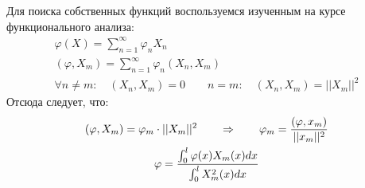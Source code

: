 \documentclass[../main.tex]{subfiles}
\begin{document}
    Для поиска собственных функций воспользуемся изученным на курсе функционального анализа:
    \begin{gather*}
        \varphi(X) = \sum_{n=1}^{\infty} \varphi_n X_n\\
        (\varphi, X_m) = \sum_{n=1}^{\infty} \varphi_n (X_n,X_m)\\
        \forall n \neq m:\quad (X_n,X_m) = 0 \qquad n=m: \quad (X_n,X_m)=||X_m||^2
    \end{gather*}
    Отсюда следует, что:
    \begin{gather*}
        (\varphi, X_m) = \varphi_m\cdot ||X_m||^2 \qquad \Rightarrow  \qquad \varphi_m = \frac{(\varphi, x_m)}{||x_m||^2}\\
        \varphi = \frac{
            \int\displaylimits_0^l \varphi(x)X_m(x)dx
        }{
            \int\displaylimits_0^l X_m^2(x)dx
        }
    \end{gather*}
\end{document}
